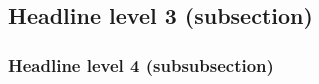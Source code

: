 \subsection{Headline level 3 (subsection)}
\vspace{3mm} %

\subsubsection{Headline level 4 (subsubsection)}
